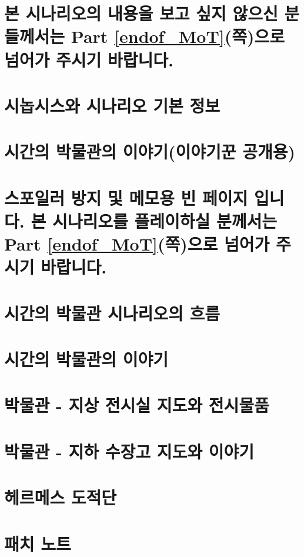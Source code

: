 \documentclass{report}
\begin{document}
	\chapter*{본 시나리오의 내용을 보고 싶지 않으신 분들께서는 Part \ref{endof_MoT}(\pageref{endof_MoT}쪽)으로 넘어가 주시기 바랍니다.}
	
	\chapter{시놉시스와 시나리오 기본 정보}
		
	
	\chapter{시간의 박물관의 이야기(이야기꾼 공개용)}
		
	
	\chapter*{스포일러 방지 및 메모용 빈 페이지 입니다. 본 시나리오를 플레이하실 분께서는 Part \ref{endof_MoT}(\pageref{endof_MoT}쪽)으로 넘어가 주시기 바랍니다.}
	
	\parttoc
	
	\chapter{시간의 박물관 시나리오의 흐름}
		
	
	\chapter{시간의 박물관의 이야기}
		
	
	\chapter{박물관 - 지상 전시실 지도와 전시물품}
		
	
	\chapter{박물관 - 지하 수장고 지도와 이야기}
		
	
	\chapter{헤르메스 도적단}
		
		
	\chapter{패치 노트}
		
\end{document}
